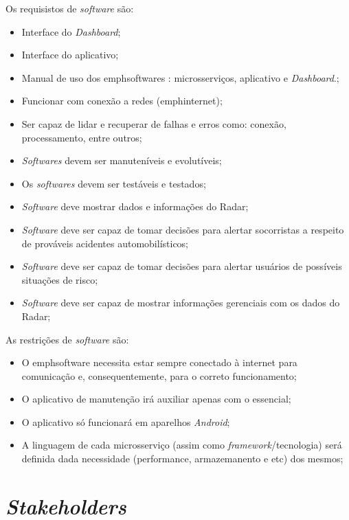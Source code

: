 Os requisistos de \emph{software} são:

\begin{itemize}
    \item Interface do \emph{Dashboard};
    \item Interface do aplicativo;
    \item Manual de uso dos emph{softwares} : microsserviços, aplicativo e \emph{Dashboard}.;
    \item Funcionar com conexão a redes (emph{internet});
    \item Ser capaz de lidar e recuperar de falhas e erros como: conexão, processamento, entre outros;
    \item \emph{Softwares} devem ser manuteníveis e evolutíveis;
    \item Os \emph{softwares} devem ser testáveis e testados;
    \item \emph{Software} deve mostrar dados e informações do Radar;
    \item \emph{Software} deve ser capaz de tomar decisões para alertar socorristas a respeito de prováveis acidentes automobilísticos;
    \item \emph{Software} deve ser capaz de tomar decisões para alertar usuários de possíveis situações de risco;
    \item \emph{Software} deve ser capaz de mostrar informações gerenciais com os dados do Radar;
\end{itemize}

As restrições de \emph{software} são:

\begin{itemize}
    \item O emph{software} necessita estar sempre conectado à internet para comunicação e, consequentemente, para o correto funcionamento;
    \item O aplicativo de manutenção irá auxiliar apenas com o essencial;
    \item O aplicativo só funcionará em aparelhos \emph{Android};
    \item A linguagem de cada microsserviço (assim como \emph{framework}/tecnologia) será definida dada necessidade (performance, armazemanento e etc) dos mesmos;
\end{itemize}

\section{\emph{Stakeholders}}

